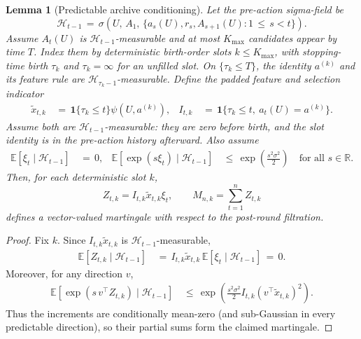 \documentclass{article} %
\newtheorem{lemma}[theorem]{Lemma}
\begin{document}
\begin{lemma}[Predictable archive conditioning]
\label{lem:3}
Let the pre-action sigma-field be
\begin{equation}
\mathcal{H}_{t-1}
\,=\,
\sigma\!\left(
U,\,
A_1,\,
\{a_s(U),r_s,A_{s+1}(U):1\,\le\, s<t\}
\right).
\end{equation}
Assume \(A_t(U)\) is \(\mathcal H_{t-1}\)-measurable and at most \(K_{\max}\)
candidates appear by time \(T\).  Index them by deterministic birth-order
slots \(k\leq K_{\max}\), with stopping-time birth \(\tau_k\) and
\(\tau_k=\infty\) for an unfilled slot.  On \(\{\tau_k\leq T\}\), the identity
\(a^{(k)}\) and its feature rule are
\(\mathcal H_{\tau_k-1}\)-measurable.  Define the padded feature and selection
indicator
\begin{equation}
\begin{aligned}
\widetilde x_{t,k}
&\,=\,\mathbf 1\{\tau_k\leq t\}\psi(U,a^{(k)}), &
I_{t,k}
&\,=\,\mathbf 1\{\tau_k\leq t,\ a_t(U)=a^{(k)}\}.
\end{aligned}
\end{equation}
Assume both are \(\mathcal H_{t-1}\)-measurable: they are zero before birth,
and the slot identity is in the pre-action history afterward.  Also assume
\begin{equation}
\begin{aligned}
\mathbb E[\xi_t\mid\mathcal H_{t-1}]
&\,=\,0, &
\mathbb{E}\!\left[\exp(s\xi_t)\mid \mathcal{H}_{t-1}\right]
&\,\leq\,
\exp\!\left(\frac{s^2\sigma^2}{2}\right)
\quad\text{for all }s\in\mathbb R.
\end{aligned}
\end{equation}
Then, for each deterministic slot \(k\),
\begin{equation}
Z_{t,k}=I_{t,k}\widetilde x_{t,k}\xi_t,
\qquad
M_{n,k}=\sum_{t=1}^n Z_{t,k}
\end{equation}
defines a vector-valued martingale with respect to the post-round filtration.
\end{lemma}

\begin{proof}
Fix \(k\).  Since \(I_{t,k}\widetilde x_{t,k}\) is
\(\mathcal H_{t-1}\)-measurable,
\begin{equation}
\begin{aligned}
\mathbb{E}[Z_{t,k}\mid \mathcal{H}_{t-1}]
&\,=\,
I_{t,k}\widetilde x_{t,k}\,
\mathbb{E}[\xi_t\mid \mathcal{H}_{t-1}]
\,=\,0.
\end{aligned}
\end{equation}
Moreover, for any direction \(v\),
\begin{equation}
\begin{aligned}
\mathbb{E}\!\left[
\exp\!\left(s\,v^\top Z_{t,k}\right)
\mid
\mathcal{H}_{t-1}
\right]
&\,\le\,
\exp\!\left(
\frac{s^2\sigma^2}{2}
I_{t,k}
(v^\top\widetilde x_{t,k})^2
\right).
\end{aligned}
\end{equation}
Thus the increments are conditionally mean-zero (and sub-Gaussian in every
predictable direction), so their partial sums form the claimed martingale.
\end{proof}
\end{document}
